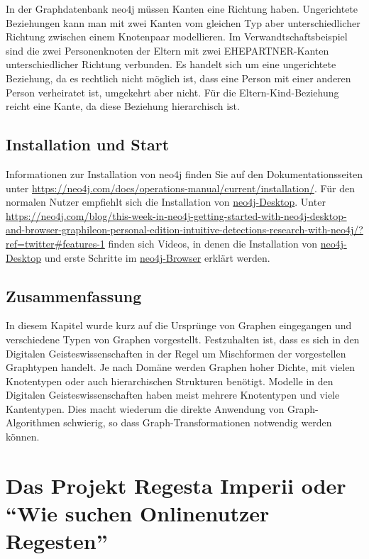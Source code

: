 \documentclass[ngerman,]{scrreprt}
\begin{document}
In der Graphdatenbank neo4j müssen Kanten eine Richtung haben. Ungerichtete Beziehungen kann man mit zwei Kanten vom gleichen Typ aber unterschiedlicher Richtung zwischen einem Knotenpaar modellieren. Im Verwandtschaftsbeispiel sind die zwei Personenknoten der Eltern mit zwei EHEPARTNER-Kanten unterschiedlicher Richtung verbunden. Es handelt sich um eine ungerichtete Beziehung, da es rechtlich nicht möglich ist, dass eine Person mit einer anderen Person verheiratet ist, umgekehrt aber nicht. Für die Eltern-Kind-Beziehung reicht eine Kante, da diese Beziehung hierarchisch ist.

\hypertarget{installation-und-start}{%
\section{Installation und Start}\label{installation-und-start}}

Informationen zur Installation von neo4j finden Sie auf den Dokumentationsseiten unter \url{https://neo4j.com/docs/operations-manual/current/installation/}. Für den normalen Nutzer empfiehlt sich die Installation von \href{https://neo4j.com/download/}{neo4j-Desktop}. Unter \url{https://neo4j.com/blog/this-week-in-neo4j-getting-started-with-neo4j-desktop-and-browser-graphileon-personal-edition-intuitive-detections-research-with-neo4j/?ref=twitter\#features-1} finden sich Videos, in denen die Installation von \href{https://www.youtube.com/watch?v=8yWhuUnPapw}{neo4j-Desktop} und erste Schritte im \href{https://www.youtube.com/watch?v=rQTximyaETA}{neo4j-Browser} erklärt werden.

\hypertarget{zusammenfassung}{%
\section{Zusammenfassung}\label{zusammenfassung}}

In diesem Kapitel wurde kurz auf die Ursprünge von Graphen eingegangen und verschiedene Typen von Graphen vorgestellt. Festzuhalten ist, dass es sich in den Digitalen Geisteswissenschaften in der Regel um Mischformen der vorgestellen Graphtypen handelt. Je nach Domäne werden Graphen hoher Dichte, mit vielen Knotentypen oder auch hierarchischen Strukturen benötigt. Modelle in den Digitalen Geisteswissenschaften haben meist mehrere Knotentypen und viele Kantentypen. Dies macht wiederum die direkte Anwendung von Graph-Algorithmen schwierig, so dass Graph-Transformationen notwendig werden können.

\hypertarget{das-projekt-regesta-imperii-oder-wie-suchen-onlinenutzer-regesten}{%
\chapter{Das Projekt Regesta Imperii oder ``Wie suchen Onlinenutzer Regesten''}\label{das-projekt-regesta-imperii-oder-wie-suchen-onlinenutzer-regesten}}
\end{document}
